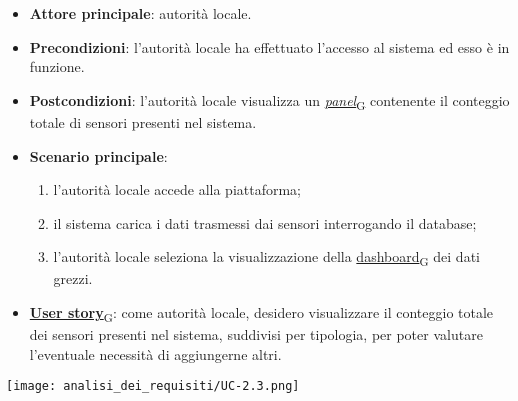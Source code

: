 \begin{itemize}
	\item \textbf{Attore principale}: autorità locale.
	\item \textbf{Precondizioni}: l'autorità locale ha effettuato l'accesso al sistema ed esso è in funzione.
	\item \textbf{Postcondizioni}: l'autorità locale visualizza un \href{https://7last.github.io/docs/rtb/documentazione-interna/glossario\#panel}{\textit{panel}\textsubscript{G}} contenente il conteggio totale di sensori presenti nel sistema.
	\item \textbf{Scenario principale}:
		\begin{enumerate}
			\item l'autorità locale accede alla piattaforma;
			\item il sistema carica i dati trasmessi dai sensori interrogando il database;
			\item l'autorità locale seleziona la visualizzazione della \href{https://7last.github.io/docs/rtb/documentazione-interna/glossario\#dashboard}{dashboard\textsubscript{G}} dei dati grezzi.
		\end{enumerate}
	\item \href{https://7last.github.io/docs/rtb/documentazione-interna/glossario\#user-story}{\textbf{User story}\textsubscript{G}}:
	      come autorità locale, desidero visualizzare il conteggio totale dei sensori presenti nel sistema, suddivisi per tipologia, per poter valutare l'eventuale necessità di aggiungerne altri.
\end{itemize}
\begin{center}
	\texttt{[image: analisi\_dei\_requisiti/UC-2.3.png]}
\end{center}
\newpage
{}
